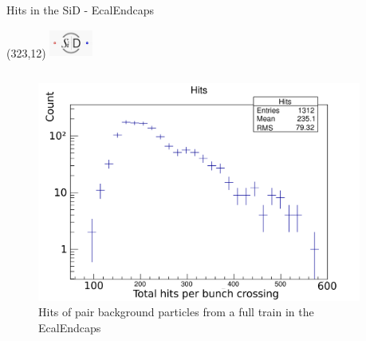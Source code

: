 \documentclass[xcolor={dvipsnames}]{beamer}
\newcommand{\sidlogo}{
  \setlength{\TPHorizModule}{1pt}
  \setlength{\TPVertModule}{1pt}
  \begin{textblock}{1}(323,12)
   \includegraphics[width=40pt,height=26pt]{figures/SiD.jpeg}
  \end{textblock}
  }
\begin{document}
\begin{frame}{Hits in the SiD - EcalEndcaps}
\sidlogo
\begin{columns}
\begin{column}[T]{0.5\textwidth}
\begin{figure}
\centering
\includegraphics[width=\textwidth]{figures/sidloi3_pairs_1312_EcalEndcap_HitsPerFile_Hits.png}
\caption{\small Hits of pair background particles from a full train in the EcalEndcaps}
\end{figure}
\end{column}
\begin{column}[T]{0.5\textwidth}
\end{column}
\end{columns}
\end{frame}
\end{document}
